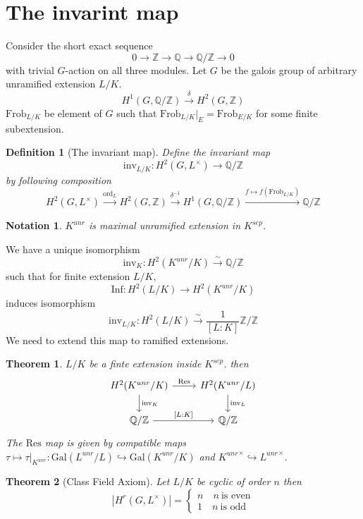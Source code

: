 \documentclass[twoside, 12pt]{iiser-thesis}
\newtheorem{thm}{Theorem}[section]
\newtheorem{defi}{ Definition}[section]
\newtheorem{notation}{ Notation}[section]
\newcommand{\Z}{\mathbb{Z}}
\newcommand{\Q}{\mathbb{Q}}
\newcommand{\gal}{\text{Gal}}
\begin{document}
\section{The invarint map}
Consider the short exact sequence $$ 0 \rightarrow \Z \rightarrow \Q \rightarrow \Q /\Z \rightarrow 0$$  with trivial $G$-action on all three modules. \newline
Let $G$ be the galois group of arbitrary unramified extension $L/K$. 
$$H^1(G, \Q /\Z ) \xrightarrow{\delta} H^2(G,\Z)$$
$\text{Frob}_{L/K}$ be element of $G$ such that $\text{Frob}_{L/K}\big |_{E}=\text{Frob}_{E/K}$ for some finite subextension.
\begin{defi}[The invariant map]
Define the invariant map $$\text{inv}_{L/K} : H^2(G,L^\times) \rightarrow \Q/\Z $$ by following composition 
$$ H^2 (G, L^\times ) \xrightarrow{\text{ord} _L} H^2 (G,\Z) \xrightarrow{\delta ^{-1}} H^1(G, \Q/\Z)\xrightarrow{f\mapsto f(\text{Frob}_{L/K})} \Q/\Z $$
\end{defi}
\begin{notation}
    $K^{unr}$ is maximal unramified extension in $K^{sep}$.
\end{notation}
We have a unique isomorphism 
$$ \text{inv}_K : H^2(K^{unr}/K) \xrightarrow{\sim} \Q/\Z$$ 
such that for finite extension $L/K$, 
$$\text{Inf}:H^2(L/K) \rightarrow H^2(K^{unr}/K)$$ induces isomorphism $$\text{inv}_{L/K}: H^2(L/K) \xrightarrow{\sim} \frac{1}{[L:K]}\Z/\Z$$
We need to extend this map to ramified extensions. 
\begin{thm}
$L/K$ be a finte extension inside $K^{sep}$. then 
$$\begin{tikzcd}
H^2(K^{unr}/K) \arrow[d, "\text{inv}_K"] \arrow[r, "\text{Res}"] & H^2(K^{unr}/L) \arrow[d, "\text{inv}_L"] \\
\Q/\Z \arrow[r, "{[L:K]}"]                                       & \Q /\Z               
\end{tikzcd}$$
The $\text{Res}$ map is given by compatible maps $\tau \mapsto \tau \big |_{K^{unr}}: \gal(L^{unr}/L) \hookrightarrow \gal (K^{unr}/K)$ and ${K^{unr }}^\times \hookrightarrow {L^{unr}}^\times$.
\end{thm}
\begin{thm}[Class Field Axiom]
Let $L/K$ be cyclic of order $n$ then $$|H^r(G,L^\times )| = 
\begin{cases}
n \quad n \ \text{is even} \\
1 \quad n \ \text{is odd}
\end{cases}$$
\end{thm}
\end{document}
